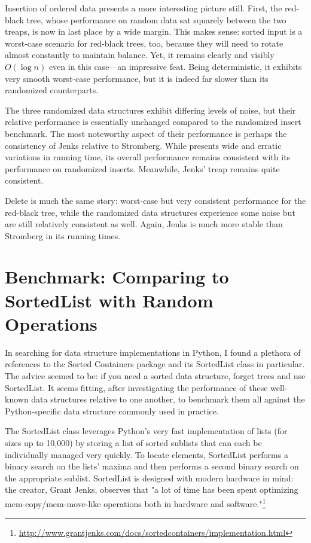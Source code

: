 \documentclass{article}
\begin{document}


Insertion of ordered data presents a more interesting picture still. First, the red-black tree, whose performance on random data sat squarely between the two treaps, is now in last place by a wide margin. This makes sense: sorted input is a worst-case scenario for red-black trees, too, because they will need to rotate almost constantly to maintain balance. Yet, it remains clearly and visibly $O(\log n)$ even in this case---an impressive feat. Being deterministic, it exhibits very smooth worst-case performance, but it is indeed far slower than its randomized counterparts.

The three randomized data structures exhibit differing levels of noise, but their relative performance is essentially unchanged compared to the randomized insert benchmark. The most noteworthy aspect of their performance is perhaps the consistency of Jenks relative to Stromberg. While presents wide and erratic variations in running time, its overall performance remains consistent with its performance on randomized inserts. Meanwhile, Jenks' treap remains quite consistent.



Delete is much the same story: worst-case but very consistent performance for the red-black tree, while the randomized data structures experience some noise but are still relatively consistent as well. Again, Jenks is much more stable than Stromberg in its running times.

\section{Benchmark: Comparing to SortedList with Random Operations}

In searching for data structure implementations in Python, I found a plethora of references to the Sorted Containers package and its SortedList class in particular. The advice seemed to be: if you need a sorted data structure, forget trees and use SortedList. It seems fitting, after investigating the performance of these well-known data structures relative to one another, to benchmark them all against the Python-specific data structure commonly used in practice. 

The SortedList class leverages Python's very fast implementation of lists (for sizes up to 10,000) by storing a list of sorted sublists that can each be individually managed very quickly. To locate elements, SortedList performs a binary search on the lists' maxima and then performs a second binary search on the appropriate sublist. SortedList is designed with modern hardware in mind: the creator, Grant Jenks, observes that "a lot of time has been spent optimizing mem-copy/mem-move-like operations both in hardware and software."\footnote{\url{http://www.grantjenks.com/docs/sortedcontainers/implementation.html}}
\end{document}
